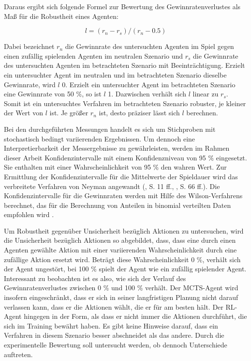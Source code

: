 Daraus ergibt sich folgende Formel zur Bewertung des Gewinnratenverlustes als Maß für die Robustheit eines Agenten:

\[l = (r_n - r_s) / (r_n - 0.5)\]

Dabei bezeichnet $r_n$ die Gewinnrate des untersuchten Agenten im Spiel gegen einen zufällig spielenden Agenten im neutralen Szenario und $r_s$ die Gewinnrate des untersuchten Agenten im betrachteten Szenario mit Beeinträchtigung. Erzielt ein untersuchter Agent im neutralen und im betrachteten Szenario dieselbe Gewinnrate, wird $l$ 0. Erzielt ein untersuchter Agent im betrachteten Szenario eine Gewinnrate von 50 \%, so ist $l$ 1. Dazwischen verhält sich $l$ linear zu $r_s$. Somit ist ein untersuchtes Verfahren im betrachteten Szenario robuster, je kleiner der Wert von $l$ ist. Je größer $r_n$ ist, desto präziser lässt sich $l$ berechnen.

Bei den durchgeführten Messungen handelt es sich um Stichproben mit stochastisch bedingt variierenden Ergebnissen. Um dennoch eine Interpretierbarkeit der Messergebnisse zu gewährleisten, werden im Rahmen dieser Arbeit Konfidenzintervalle mit einem Konfidenzniveau von 95 \% eingesetzt. Sie enthalten mit einer Wahrscheinlichkeit von 95 \% den wahren Wert. Zur Ermittlung der Konfidenzintervalle für die Mittelwerte der Spieldauer wird das verbreitete Verfahren von Neyman angewandt (\cite{Frost.2023}, S. 11 ff., \cite{Janzyk.2020}, S. 66 ff.). Die Konfidenzintervalle für die Gewinnraten werden mit Hilfe des Wilson-Verfahrens berechnet, das für die Berechnung von Anteilen in binomial verteilten Daten empfohlen wird \cite{Wallis.2013} \cite{Lawrence.2001}.

Um Robustheit gegenüber Unsicherheit bezüglich Aktionen zu untersuchen, wird die Unsicherheit bezüglich Aktionen so abgebildet, dass, dass eine durch einen Agenten gewählte Aktion mit einer variierenden Wahrscheinlichkeit durch eine zufällige Aktion ersetzt wird. Beträgt diese Wahrscheinlichkeit 0 \%, verhält sich der Agent ungestört, bei 100 \% spielt der Agent wie ein zufällig spielender Agent. Interessant zu beobachten ist es also, wie sich der Verlauf des Gewinnratenverlustes zwischen 0 \% und 100 \% verhält. Der MCTS-Agent wird insofern eingeschränkt, dass er sich in seiner langfristigen Planung nicht darauf verlassen kann, dass er die Aktionen wählt, die er für am besten hält. Der RL-Agent hingegen in der Form, als dass er nicht immer die Aktionen durchführt, die sich im Training bewährt haben. Es gibt keine Hinweise darauf, dass ein Verfahren in diesem Szenario besser abschneidet als das andere. Durch die experimentelle Bewertung soll untersucht werden, ob dennoch Unterschiede auftreten.

